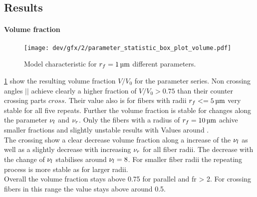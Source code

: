 \subsection{Results}
% 
\paragraph{Volume fraction}
% 
\begin{figure}[p]
\centering
\texttt{[image: dev/gfx/2/parameter\_statistic\_box\_plot\_volume.pdf]}
\caption[Model characteristics]{Model characteristic for $\fiberRadius = \SI{1}{\micro\meter}$ different parameters. }
\label{fig:psbp1}
\end{figure}
% 
\cref{fig:psbp1} show the resulting volume fraction $V/V_0$ for the parameter series.
Non crossing angles $||$ achieve clearly a higher fraction of $V/V_0 > 0.75$ than their counter crossing parts $cross$.
Their value also is for fibers with radii $\fiberRadius <= \SI{5}{\micro\meter}$ very stable for all five repeats.
Further the volume fraction is stable for changes along the parameter $\textnormal{$\nu_{l}$}$ and $\textnormal{$\nu_{r}$}$. 
Only the fibers with a radius of $\fiberRadius = \SI{10}{\micro\meter}$ achive smaller fractions and slightly unstable results with Values around \dummy{}.
\\
The crossing \dummy{} show a clear decrease volume fraction along a increase of the $\textnormal{$\nu_{l}$}$ as well as a slightly decrease with increasing $\textnormal{$\nu_{r}$}$ for all fiber radii.
The decrease with the change of $\textnormal{$\nu_{l}$}$ stabilises around $\textnormal{$\nu_{l}$} = \num{8}$.
For smaller fiber radii the repeating process is more stable as for larger radii.
\\
Overall the volume fraction stays above 0.75 for parallel and fr > 2.
For crossing fibers in this range the value stays above around 0.5.
% 
